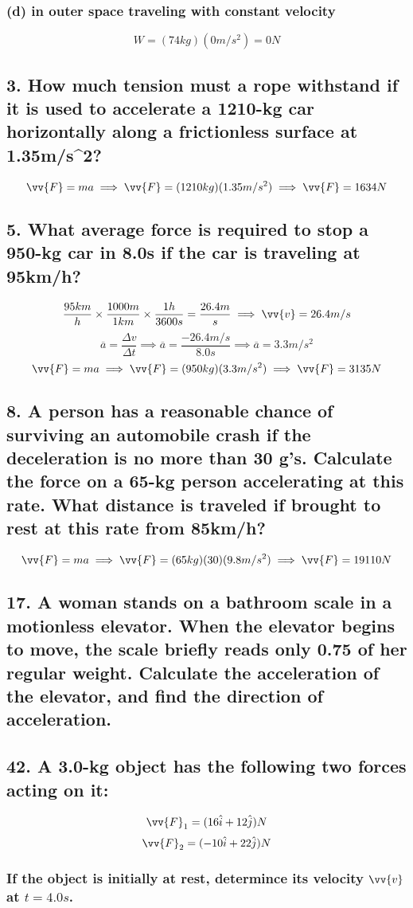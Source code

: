 \documentclass[12pt,a4paper,english]{article}
\begin{document}
\begin{flushleft}
  \subsubsection{(d) in outer space traveling with constant velocity}
  \[
    W=(74kg)(0m/s^2)=0N
  \]
  \subsection{3. How much tension must a rope withstand if it is used to accelerate a 1210-kg car horizontally along a frictionless surface at 1.35m/s^2?}
  \[
    \vv{F}=ma\implies
    \vv{F}=(1210kg)(1.35m/s^2)\implies
    \vv{F}=1634N
  \]
  \subsection{5. What average force is required to stop a 950-kg car in 8.0s if the car is traveling at 95km/h?}
  \[
    \frac{95km}{h}\times\frac{1000m}{1km}\times\frac{1h}{3600s}=
    \frac{26.4m}{s}\implies
    \vv{v}=26.4m/s
  \]
  \[
    \overline{a}=\frac{\Delta v}{\Delta t}\implies
    \overline{a}=\frac{-26.4m/s}{8.0s}\implies
    \overline{a}=3.3m/s^2
  \]
  \[
    \vv{F}=ma\implies
    \vv{F}=(950kg)(3.3m/s^2)\implies
    \vv{F}=3135N
  \]
  \subsection{8. A person has a reasonable chance of surviving an automobile crash if the deceleration is no more than 30 g's. Calculate the force on a 65-kg person accelerating at this rate. What distance is traveled if brought to rest at this rate from 85km/h?}
  \[
    \vv{F}=ma\implies
    \vv{F}=(65kg)(30)(9.8m/s^2)\implies
    \vv{F}=19110N
  \]
  \subsection{17. A woman stands on a bathroom scale in a motionless elevator. When the elevator begins to move, the scale briefly reads only 0.75 of her regular weight. Calculate the acceleration of the elevator, and find the direction of acceleration.}
  \subsection{42. A 3.0-kg object has the following two forces acting on it:}
  \[
    \vv{F}_1=(16\hat{i}+12\hat{j})N
  \]
  \[
    \vv{F}_2=(-10\hat{i}+22\hat{j})N
  \]
  \subsubsection{If the object is initially at rest, determince its velocity $\vv{v}$ at $t=4.0s$.}

\end{flushleft}
\end{document}
